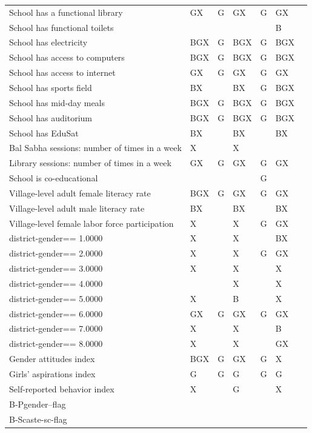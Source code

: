 \begin{tabular}{@{\extracolsep{1pt}}p{7.8cm}*{6}{>{\centering\arraybackslash}m{2cm}}@{}}
School has a functional library & GX & G & GX & G & GX \\ 
School has functional toilets &  &  &  &  & B \\ 
School has electricity & BGX & G & BGX & G & BGX \\ 
School has access to computers & BGX & G & BGX & G & BGX \\ 
School has access to internet & GX & G & GX & G & GX \\ 
School has sports field & BX &  & BX & G & BGX \\ 
School has mid-day meals & BGX & G & BGX & G & BGX \\ 
School has auditorium & BGX & G & BGX & G & BGX \\ 
School has EduSat & BX &  & BX &  & BX \\ 
Bal Sabha sessions: number of times in a week & X &  & X &  &  \\ 
Library sessions: number of times in a week & GX & G & GX & G & GX \\ 
School is co-educational &  &  &  & G &  \\ 
Village-level adult female literacy rate & BGX & G & GX & G & GX \\ 
Village-level adult male literacy rate & BX &  & BX &  & BX \\ 
Village-level female labor force participation & X &  & X & G & GX \\ 
district-gender==     1.0000 & X &  & X &  & BX \\ 
district-gender==     2.0000 & X &  & X & G & GX \\ 
district-gender==     3.0000 & X &  & X &  & X \\ 
district-gender==     4.0000 &  &  & X &  & X \\ 
district-gender==     5.0000 & X &  & B &  & X \\ 
district-gender==     6.0000 & GX & G & GX & G & GX \\ 
district-gender==     7.0000 & X &  & X &  & B \\ 
district-gender==     8.0000 & X &  & X &  & GX \\ 
Gender attitudes index & BGX & G & GX & G & X \\ 
Girls' aspirations index & G & G & G & G & G \\ 
Self-reported behavior index & X &  & G &  & X \\ 
B-Pgender--flag &  &  &  &  &  \\ 
B-Scaste-sc-flag &  &  &  &  &  \\ 

\end{tabular}
